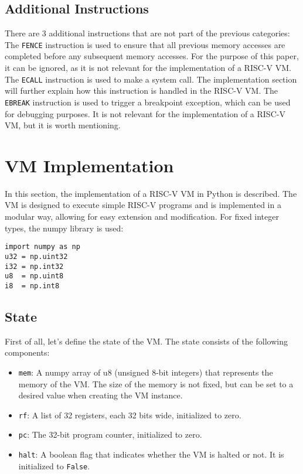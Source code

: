 \documentclass[sigconf]{acmart}
\begin{document}
\subsection{Additional Instructions}
There are 3 additional instructions that are not part of the previous categories:
The \texttt{FENCE} instruction is used to ensure that all previous memory accesses are completed before any subsequent memory accesses. For the purpose of this paper, it can be ignored, as it is not relevant for the implementation of a RISC-V VM.
The \texttt{ECALL} instruction is used to make a system call. The implementation section will  further explain how this instruction is handled in the RISC-V VM.
The \texttt{EBREAK} instruction is used to trigger a breakpoint exception, which can be used for debugging purposes. It is not relevant for the implementation of a RISC-V VM, but it is worth mentioning.

\section{VM Implementation}
In this section, the implementation of a RISC-V VM in Python is described. The VM is designed to execute simple RISC-V programs and is implemented in a modular way, allowing for easy extension and modification.
For fixed integer types, the numpy library is used:
\begin{verbatim}
import numpy as np
u32 = np.uint32
i32 = np.int32
u8  = np.uint8
i8  = np.int8
\end{verbatim}

\subsection{State}
First of all, let's define the state of the VM. The state consists of the following components:
\begin{itemize}
    \item \texttt{mem}: A numpy array of u8 (unsigned 8-bit integers) that represents the memory of the VM. The size of the memory is not fixed, but can be set to a desired value when creating the VM instance.
    \item \texttt{rf}: A list of 32 registers, each 32 bits wide, initialized to zero.
    \item \texttt{pc}: The 32-bit program counter, initialized to zero.
    \item \texttt{halt}: A boolean flag that indicates whether the VM is halted or not. It is initialized to \texttt{False}.
\end{itemize}
\end{document}
